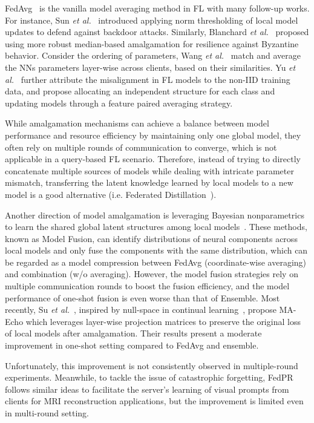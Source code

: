 FedAvg~\cite{mcmahan2017communication} is the vanilla model averaging method in FL with many follow-up works. 
For instance, Sun \textit{et al.}~\cite{sun2019can} introduced applying norm thresholding of local model updates to defend against backdoor attacks.
Similarly, Blanchard \textit{et al.}~\cite{blanchard2017machine} proposed using more robust median-based amalgamation for resilience against Byzantine behavior.
Consider the ordering of parameters, Wang \textit{et al.}~\cite{wang2020federated} match and average the NNs parameters layer-wise across clients, based on their similarities.
Yu \textit{et al.}~\cite{yu2021fed2} further attribute the misalignment in FL models to the non-IID training data, and propose allocating an independent structure for each class and updating models through a feature paired averaging strategy.

While amalgamation mechanisms can achieve a balance between model performance and resource efficiency by maintaining only one global model, they often rely on multiple rounds of communication to converge, which is not applicable in a query-based FL scenario.
Therefore, instead of trying to directly concatenate multiple sources of models while dealing with intricate parameter mismatch, transferring the latent knowledge learned by local models to a new model is a good alternative (i.e. Federated Distillation~\cite{jeong2018communication, jin2023feddyn}).

Another direction of model amalgamation is leveraging Bayesian nonparametrics to learn the shared global latent structures among local models~\cite{yurochkin2019bayesian, yurochkin2019statistical, lam2021model}. 
These methods, known as Model Fusion, can identify distributions of neural components across local models and only fuse the components with the same distribution, which can be regarded as a model compression between FedAvg (coordinate-wise averaging) and combination (w/o averaging).
However, the model fusion strategies rely on multiple communication rounds to boost the fusion efficiency, and the model performance of one-shot fusion is even worse than that of Ensemble.
Most recently, Su \textit{et al.}~\cite{su2023one}, inspired by null-space in continual learning~\cite{wang2021training, kong2022balancing}, propose MA-Echo which leverages layer-wise projection matrices to preserve the original loss of local models after amalgamation.
Their results present a moderate improvement in one-shot setting compared to FedAvg and ensemble.

Unfortunately, this improvement is not consistently observed in multiple-round experiments.
Meanwhile, to tackle the issue of catastrophic forgetting, FedPR~\cite{feng2023learning} follows similar ideas to facilitate the server's learning of visual prompts from clients for MRI reconstruction applications, but the improvement is limited even in multi-round setting. %

